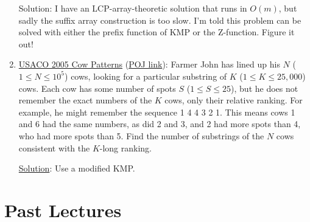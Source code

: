 \documentclass[11pt, oneside]{article}
\begin{document}
\begin{enumerate}
  Solution: I have an LCP-array-theoretic solution that runs in \( O(m) \), but sadly the suffix array construction is too slow. I'm told this problem can be solved with either the prefix function of KMP or the Z-function. Figure it out!

  \item \href{https://contest.usaco.org/DEC05.htm}{USACO 2005 Cow Patterns} (\href{http://poj.org/problem?id=3167}{POJ link}): Farmer John has lined up his \( N \) (\( 1 \leq N \leq 10^5 \)) cows,
  looking for a particular substring of \( K \) (\( 1 \leq K \leq 25,000 \)) cows.
  Each cow has some number of spots \( S \) (\( 1 \leq S \leq 25 \)), but he does
  not remember the exact numbers of the \( K \) cows, only their relative ranking. For example, he might
  remember the sequence 1 4 4 3 2 1. This means cows 1 and 6 had the same numbers, as did 2 and 3,
  and 2 had more spots than 4, who had more spots than 5.
  Find the number of substrings of the \( N \) cows consistent with the \( K \)-long ranking.

  \href{https://contest.usaco.org/DEC05anal/cpattern.htm}{Solution}: Use a modified KMP.

\end{enumerate}

\newpage

\section{Past Lectures}
\end{document}
